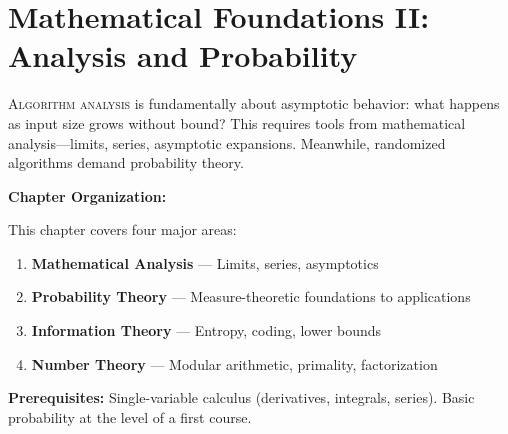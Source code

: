 \chapter{Mathematical Foundations II: Analysis and Probability}
\label{ch:analysis-probability}

\lettrine[lines=3]{A}{lgorithm analysis} is fundamentally about asymptotic 
behavior: what happens as input size grows without bound? This requires tools 
from mathematical analysis—limits, series, asymptotic expansions. Meanwhile, 
randomized algorithms demand probability theory.

\begin{chapterintro}
\textbf{Chapter Organization:}

This chapter covers four major areas:
\begin{enumerate}[noitemsep]
    \item \textbf{Mathematical Analysis} — Limits, series, asymptotics
    \item \textbf{Probability Theory} — Measure-theoretic foundations to applications
    \item \textbf{Information Theory} — Entropy, coding, lower bounds
    \item \textbf{Number Theory} — Modular arithmetic, primality, factorization
\end{enumerate}

\textbf{Prerequisites:} Single-variable calculus (derivatives, integrals, series). 
Basic probability at the level of a first course.
\end{chapterintro}




